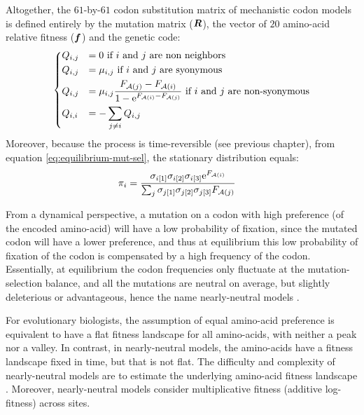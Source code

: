 Altogether, the $61$-by-$61$ codon substitution matrix of mechanistic codon models is defined entirely by the mutation matrix ($\bm{R}$), the vector of $20$ amino-acid relative fitness ($\bm{f}$) and the genetic code:
\begin{equation}
\begin{dcases}
Q_{{i}, {j}} & = 0 \text{ if ${i}$ and ${j}$ are non neighbors} \\
Q_{{i}, {j}} & = \mu_{{i}, {j}} \text{ if ${i}$ and ${j}$ are syonymous} \\
Q_{{i}, {j}} & = \mu_{{i}, {j}} \dfrac{F_{\mathcal{A}({j})} - F_{\mathcal{A}({i})}}{1 - \mathrm{e}^{F_{\mathcal{A}({i})} - F_{\mathcal{A}({j})}} } \text{ if ${i}$ and ${j}$ are non-syonymous} \\
Q_{{i}, {i}} & = - \sum_{{j} \neq {i}} Q_{{i}, {j}}
\end{dcases}
\label{eq:propensities-models}
\end{equation}
Moreover, because the process is time-reversible (see previous chapter), from equation \ref{eq:equilibrium-mut-sel}, the stationary distribution equals:
\begin{align}
\pi_{{i}} & = \dfrac{\sigma_{{i}[1]}\sigma_{{i}[2]}\sigma_{{i}[3]}\mathrm{e}^{F_{\mathcal{A}({i})}}}{\sum_{{j}}\sigma_{{j}[1]}\sigma_{{j}[2]}\sigma_{{j}[3]}F_{\mathcal{A}({j})} }
\end{align}

From a dynamical perspective, a mutation on a \gls{codon} with high preference (of the encoded amino-acid) will have a low probability of fixation, since the mutated \gls{codon} will have a lower preference, and thus at equilibrium this low probability of fixation of the \gls{codon} is compensated by a high frequency of the \gls{codon}.
Essentially, at equilibrium the \gls{codon} frequencies only fluctuate at the mutation-selection balance, and all the mutations are \gls{neutral} on average, but slightly deleterious or advantageous, hence the name \gls{nearly-neutral} models \citep{Ohta1973, Ohta1992, Rodrigue2016}.

For evolutionary biologists, the assumption of equal amino-acid preference is equivalent to have a flat fitness landscape for all amino-acids, with neither a peak nor a valley.
In contrast, in \gls{nearly-neutral} models, the amino-acids have a fitness landscape fixed in time, but that is not flat.
The difficulty and complexity of \gls{nearly-neutral} models are to estimate the underlying amino-acid fitness landscape \citep{Halpern1998}.
Moreover, \gls{nearly-neutral} models consider multiplicative fitness (additive log-fitness) across sites.

